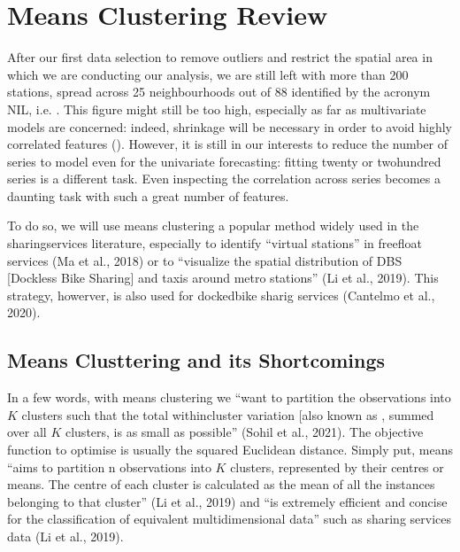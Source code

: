 \documentclass[letterpaper,10pt,english]{jupyterBook}
\begin{document}
\section{\sphinxhyphen{}Means Clustering Review}
\label{\detokenize{04-stations_kmeans:k-means-clustering-review}}
\sphinxAtStartPar
After our first data selection to remove outliers and restrict the spatial area in which we are conducting our analysis,
we are still left with more than 200 stations, spread across 25 neighbourhoods out of 88 \sphinxhyphen{} identified by the acronym NIL, i.e. . This figure might still be too high, especially as far as multivariate models are concerned: indeed, shrinkage will be necessary in order to avoid highly correlated features ().
However, it is still in our interests to reduce the number of series to model even for the univariate forecasting: fitting twenty or two\sphinxhyphen{}hundred series is a different task. Even inspecting the correlation across series becomes a daunting task with such a great number of features.

\sphinxAtStartPar
To do so, we will use \sphinxhyphen{}means clustering \sphinxhyphen{} a popular method widely used in the sharing\sphinxhyphen{}services literature, especially to identify “virtual stations” in free\sphinxhyphen{}float services (Ma et al., 2018) or to “visualize the spatial distribution of DBS {[}Dockless Bike Sharing{]} and taxis around metro stations” (Li et al., 2019). This strategy, howerver, is also used for docked\sphinxhyphen{}bike sharig services (Cantelmo et al., 2020).


\subsection{\sphinxhyphen{}Means Clusttering and its Shortcomings}
\label{\detokenize{04-stations_kmeans:k-means-clusttering-and-its-shortcomings}}
\sphinxAtStartPar
In a few words, with \sphinxhyphen{}means clustering  we “want to partition the observations into \(K\) clusters such that the total within\sphinxhyphen{}cluster variation {[}also known as  \sphinxstyleemphasis{inertia}{]}, summed over all \(K\) clusters, is as small as possible” (Sohil et al., 2021). The objective function to optimise is usually the squared Euclidean distance. Simply put, \sphinxhyphen{}means “aims to partition n observations into \(K\) clusters, represented by their centres or means. The centre of each cluster is calculated as the mean of all the instances belonging to that cluster” (Li et al., 2019) and “is extremely efficient and concise for the classification of equivalent multidimensional data” such as sharing services data (Li et al., 2019).
\end{document}
